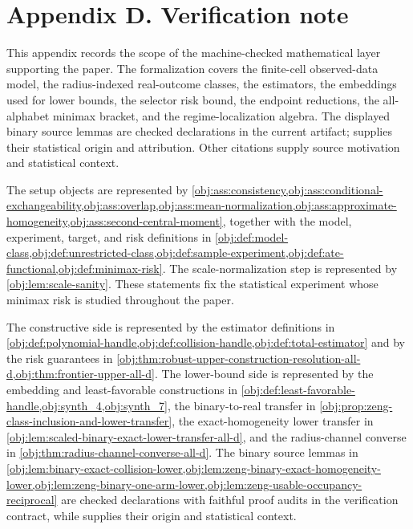 \section{Appendix D. Verification note}

This appendix records the scope of the machine-checked mathematical layer supporting the paper. The formalization covers the finite-cell observed-data model, the radius-indexed real-outcome classes, the estimators, the embeddings used for lower bounds, the selector risk bound, the endpoint reductions, the all-alphabet minimax bracket, and the regime-localization algebra. The displayed binary source lemmas are checked declarations in the current artifact; \citet{ZengBalakrishnanHanKennedy2024} supplies their statistical origin and attribution. Other citations supply source motivation and statistical context.

The setup objects are represented by \cref{obj:ass:consistency,obj:ass:conditional-exchangeability,obj:ass:overlap,obj:ass:mean-normalization,obj:ass:approximate-homogeneity,obj:ass:second-central-moment}, together with the model, experiment, target, and risk definitions in \cref{obj:def:model-class,obj:def:unrestricted-class,obj:def:sample-experiment,obj:def:ate-functional,obj:def:minimax-risk}. The scale-normalization step is represented by \cref{obj:lem:scale-sanity}. These statements fix the statistical experiment whose minimax risk is studied throughout the paper.

The constructive side is represented by the estimator definitions in \cref{obj:def:polynomial-handle,obj:def:collision-handle,obj:def:total-estimator} and by the risk guarantees in \cref{obj:thm:robust-upper-construction-resolution-all-d,obj:thm:frontier-upper-all-d}. The lower-bound side is represented by the embedding and least-favorable constructions in \cref{obj:def:least-favorable-handle,obj:synth_4,obj:synth_7}, the binary-to-real transfer in \cref{obj:prop:zeng-class-inclusion-and-lower-transfer}, the exact-homogeneity lower transfer in \cref{obj:lem:scaled-binary-exact-lower-transfer-all-d}, and the radius-channel converse in \cref{obj:thm:radius-channel-converse-all-d}. The binary source lemmas in \cref{obj:lem:binary-exact-collision-lower,obj:lem:zeng-binary-exact-homogeneity-lower,obj:lem:zeng-binary-one-arm-lower,obj:lem:zeng-usable-occupancy-reciprocal} are checked declarations with faithful proof audits in the verification contract, while \citet{ZengBalakrishnanHanKennedy2024} supplies their origin and statistical context.

